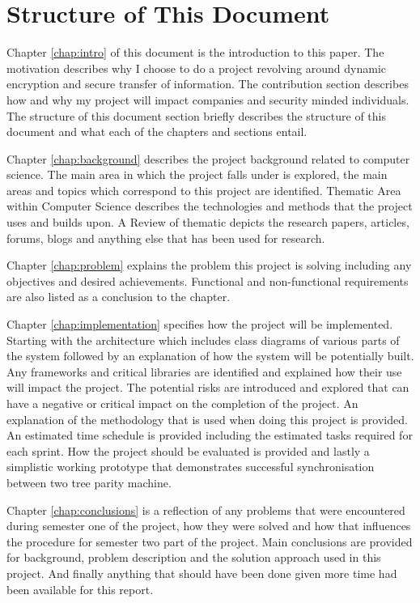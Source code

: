 \section{Structure of This Document}
Chapter \ref{chap:intro} of this document is the introduction to this paper. The motivation describes why I choose to do a project revolving around dynamic encryption and secure transfer of information. The contribution section describes how and why my project will impact companies and security minded individuals. The structure of this document section briefly describes the structure of this document and what each of the chapters and sections entail.

Chapter \ref{chap:background} describes the project background related to computer science. The main area in which the project falls under is explored, the main areas and topics which correspond to this project are identified. Thematic Area within Computer Science describes the technologies and methods that the project uses and builds upon. A Review of thematic depicts the research papers, articles, forums, blogs and anything else that has been used for research.

Chapter \ref{chap:problem} explains the problem this project is solving including any objectives and desired achievements. Functional and non-functional requirements are also listed as a conclusion to the chapter.

Chapter \ref{chap:implementation} specifies how the project will be implemented. Starting with the architecture which includes class diagrams of various parts of the system followed by an explanation of how the system will be potentially built. Any frameworks and critical libraries are identified and explained how their use will impact the project. The potential risks are introduced and explored that can have a negative or critical impact on the completion of the project. An explanation of the methodology that is used when doing this project is provided. An estimated time schedule is provided including the estimated tasks required for each sprint. How the project should be evaluated is provided and lastly a simplistic working prototype that demonstrates successful synchronisation between two tree parity machine.

Chapter \ref{chap:conclusions} is a reflection of any problems that were encountered during semester one of the project, how they were solved and how that influences the procedure for semester two part of the project. Main conclusions are provided for background, problem description and the solution approach used in this project. And finally anything that should have been done given more time had been available for this report.
